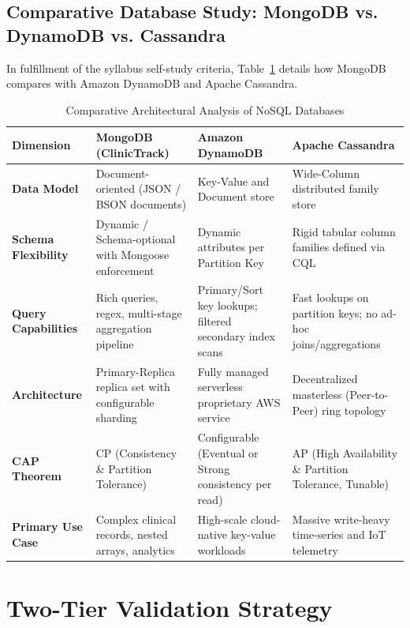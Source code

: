\documentclass[12pt,a4paper,oneside]{report}
\begin{document}
\section{Comparative Database Study: MongoDB vs. DynamoDB vs. Cassandra}
In fulfillment of the syllabus self-study criteria, Table~\ref{tab:db_comparison} details how MongoDB compares with Amazon DynamoDB and Apache Cassandra.

\begin{table}[h!]
\centering
\caption{Comparative Architectural Analysis of NoSQL Databases}
\label{tab:db_comparison}
\small
\begin{tabularx}{\textwidth}{p{3.0cm} X X X}
\toprule
\textbf{Dimension} & \textbf{MongoDB (ClinicTrack)} & \textbf{Amazon DynamoDB} & \textbf{Apache Cassandra} \\
\midrule
\textbf{Data Model} & Document-oriented (JSON / BSON documents) & Key-Value and Document store & Wide-Column distributed family store \\
\midrule
\textbf{Schema Flexibility} & Dynamic / Schema-optional with Mongoose enforcement & Dynamic attributes per Partition Key & Rigid tabular column families defined via CQL \\
\midrule
\textbf{Query Capabilities} & Rich queries, regex, multi-stage aggregation pipeline & Primary/Sort key lookups; filtered secondary index scans & Fast lookups on partition keys; no ad-hoc joins/aggregations \\
\midrule
\textbf{Architecture} & Primary-Replica replica set with configurable sharding & Fully managed serverless proprietary AWS service & Decentralized masterless (Peer-to-Peer) ring topology \\
\midrule
\textbf{CAP Theorem} & CP (Consistency \& Partition Tolerance) & Configurable (Eventual or Strong consistency per read) & AP (High Availability \& Partition Tolerance, Tunable) \\
\midrule
\textbf{Primary Use Case} & Complex clinical records, nested arrays, analytics & High-scale cloud-native key-value workloads & Massive write-heavy time-series and IoT telemetry \\
\bottomrule
\end{tabularx}
\end{table}

\chapter{Two-Tier Validation Strategy}
\end{document}
